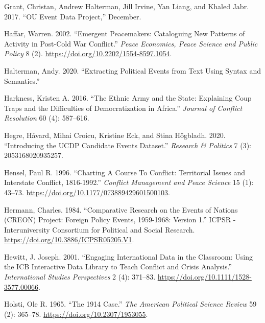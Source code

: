\documentclass{article}
\newlength{\cslhangindent}
\newlength{\cslentryspacingunit} %
\newenvironment{CSLReferences}[2] %
 {%
  \setlength{\parindent}{0pt}
  \ifodd #1
  \let\oldpar\par
  \def\par{\hangindent=\cslhangindent\oldpar}
  \fi
  \setlength{\parskip}{#2\cslentryspacingunit}
 }%
 {}
\begin{document}
\begin{CSLReferences}{1}{0}
\leavevmode{}%
Grant, Christan, Andrew Halterman, Jill Irvine, Yan Liang, and Khaled
Jabr. 2017. {``{OU Event Data Project},''} December.

\leavevmode{}%
Haffar, Warren. 2002. {``Emergent {Peacemakers}: {Cataloguing New
Patterns} of {Activity} in {Post-Cold War Conflict}.''} \emph{Peace
Economics, Peace Science and Public Policy} 8 (2).
\url{https://doi.org/10.2202/1554-8597.1054}.

\leavevmode{}%
Halterman, Andy. 2020. {``Extracting {Political Events} from {Text Using
Syntax} and {Semantics}.''}

\leavevmode{}%
Harkness, Kristen A. 2016. {``The Ethnic Army and the State:
{Explaining} Coup Traps and the Difficulties of Democratization in
{Africa}.''} \emph{Journal of Conflict Resolution} 60 (4): 587--616.

\leavevmode{}%
Hegre, Håvard, Mihai Croicu, Kristine Eck, and Stina Högbladh. 2020.
{``Introducing the {UCDP Candidate Events Dataset}.''} \emph{Research \&
Politics} 7 (3): 2053168020935257.

\leavevmode{}%
Hensel, Paul R. 1996. {``Charting {A Course To Conflict}: {Territorial
Issues} and {Interstate Conflict}, 1816-1992.''} \emph{Conflict
Management and Peace Science} 15 (1): 43--73.
\url{https://doi.org/10.1177/073889429601500103}.

\leavevmode{}%
Hermann, Charles. 1984. {``Comparative {Research} on the {Events} of
{Nations} ({CREON}) {Project}: {Foreign Policy Events}, 1959-1968:
{Version} 1.''} {ICPSR - Interuniversity Consortium for Political and
Social Research}. \url{https://doi.org/10.3886/ICPSR05205.V1}.

\leavevmode{}%
Hewitt, J. Joseph. 2001. {``Engaging {International Data} in the
{Classroom}: {Using} the {ICB Interactive Data Library} to {Teach
Conflict} and {Crisis Analysis}.''} \emph{International Studies
Perspectives} 2 (4): 371--83.
\url{https://doi.org/10.1111/1528-3577.00066}.

\leavevmode{}%
Holsti, Ole R. 1965. {``The 1914 {Case}.''} \emph{The American Political
Science Review} 59 (2): 365--78. \url{https://doi.org/10.2307/1953055}.


\end{CSLReferences}
\end{document}
